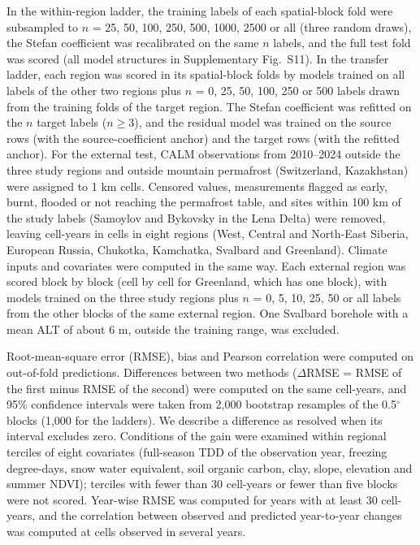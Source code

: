 In the within-region ladder, the training labels of each spatial-block fold were subsampled to $n$ = 25, 50, 100, 250, 500, 1000, 2500 or all (three random draws), the Stefan coefficient was recalibrated on the same $n$ labels, and the full test fold was scored (all model structures in Supplementary Fig.~S11). In the transfer ladder, each region was scored in its spatial-block folds by models trained on all labels of the other two regions plus $n$ = 0, 25, 50, 100, 250 or 500 labels drawn from the training folds of the target region. The Stefan coefficient was refitted on the $n$ target labels ($n \geq 3$), and the residual model was trained on the source rows (with the source-coefficient anchor) and the target rows (with the refitted anchor). For the external test, CALM observations from 2010--2024\cite{Streletskiy2025} outside the three study regions and outside mountain permafrost (Switzerland, Kazakhstan) were assigned to 1 km cells. Censored values, measurements flagged as early, burnt, flooded or not reaching the permafrost table, and sites within 100 km of the study labels (Samoylov and Bykovsky in the Lena Delta) were removed, leaving \nextcy{} cell-years in \nextcells{} cells in eight regions (West, Central and North-East Siberia, European Russia, Chukotka, Kamchatka, Svalbard and Greenland). Climate inputs and covariates were computed in the same way. Each external region was scored block by block (cell by cell for Greenland, which has one block), with models trained on the three study regions plus $n$ = 0, 5, 10, 25, 50 or all labels from the other blocks of the same external region. One Svalbard borehole with a mean ALT of about 6 m, outside the training range, was excluded.

Root-mean-square error (RMSE), bias and Pearson correlation were computed on out-of-fold predictions. Differences between two methods ($\Delta$RMSE = RMSE of the first minus RMSE of the second) were computed on the same cell-years, and 95\% confidence intervals were taken from 2,000 bootstrap resamples of the 0.5$^\circ$ blocks (1,000 for the ladders). We describe a difference as resolved when its interval excludes zero. Conditions of the gain were examined within regional terciles of eight covariates (full-season TDD of the observation year, freezing degree-days, snow water equivalent, soil organic carbon, clay, slope, elevation and summer NDVI); terciles with fewer than 30 cell-years or fewer than five blocks were not scored. Year-wise RMSE was computed for years with at least 30 cell-years, and the correlation between observed and predicted year-to-year changes was computed at cells observed in several years.

